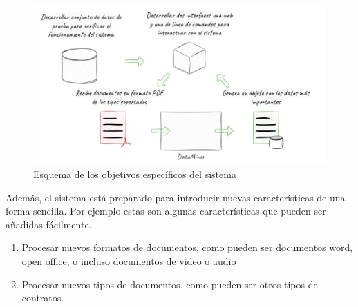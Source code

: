 \begin{figure}
    \begin{center}
        \includegraphics[width=\textwidth]{chapter/1/images/chapter_1.specific}
        \caption{Esquema de los objetivos específicos del sistema}
        \label{fig:chapter_1.specific}
    \end{center}
\end{figure}

Además, el sistema está preparado para introducir nuevas características de una forma sencilla.
Por ejemplo estas son algunas características que pueden ser añadidas fácilmente.

\begin{enumerate}
    \item
    Procesar nuevos formatos de documentos, como pueden ser documentos word, open office, o incluso documentos de video
    o audio
    \item
    Procesar nuevos tipos de documentos, como pueden ser otros tipos de contratos.
\end{enumerate}
